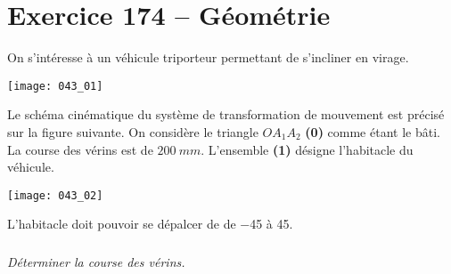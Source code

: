 \section*{Exercice 174 -- Géométrie}

\setcounter{exo}{0}
On s'intéresse à un véhicule triporteur permettant de s'incliner en virage.
\begin{center}
\texttt{[image: 043\_01]}
\end{center}

 Le schéma cinématique du système de transformation de mouvement est précisé sur la figure suivante. On considère le triangle $OA_1A_2$ \textbf{(0)} comme étant le bâti. La course des vérins est de $\SI{200}{mm}$. L'ensemble \textbf{(1)} désigne l'habitacle du véhicule.


\begin{center}
\texttt{[image: 043\_02]}
\end{center}
 
L'habitacle doit pouvoir se dépalcer de de \SI{-45}{\degres} à \SI{+45}{\degres}. 
\subparagraph{}\textit{Déterminer la course des vérins.}
